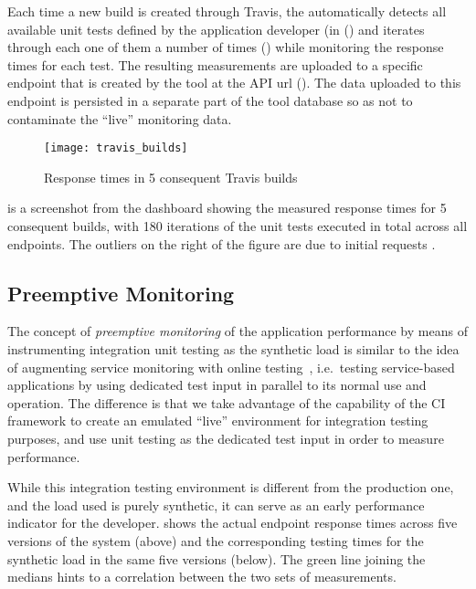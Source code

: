   Each time a new build is created through Travis, the \tool automatically detects all available unit tests defined by the application developer (in () and iterates through each one of them a number of times () while monitoring the response times for each test. The resulting measurements are uploaded to a specific endpoint that is created by the tool at the API url (). The data uploaded to this endpoint is   persisted in a separate part of the tool database so as not to contaminate the ``live'' monitoring data. 

      \begin{figure}[h!]
        \centering
        \texttt{[image: travis\_builds]}
        \caption{Response times in 5 consequent Travis builds}
        \label{fig:builds}
      \end{figure}

   is a screenshot from the dashboard showing the measured response times for 5 consequent builds, with 180 iterations of the unit tests executed in total across all endpoints. The outliers on the right of the figure are due to initial requests .  
  


  \subsection*{Preemptive Monitoring}
  The concept of {\em preemptive monitoring} of the application performance by means of instrumenting integration unit testing as the synthetic load is similar to the idea of augmenting service monitoring with online testing~\cite{metzger2010proactive}, i.e.~testing service-based applications by using dedicated test input in parallel to its normal use and operation. The difference is that we take advantage of the capability of the CI framework to create an emulated ``live'' environment for integration testing purposes, and use unit testing as the dedicated test input in order to measure performance. 
  
  While this integration testing environment is different from the production one, and the load used is purely synthetic, it can serve as an early performance indicator for the developer.   shows the actual endpoint response times across five versions of the system (above) and the corresponding testing times for the synthetic load in the same five versions (below). The green line joining the medians hints to a correlation between the two sets of measurements. 

